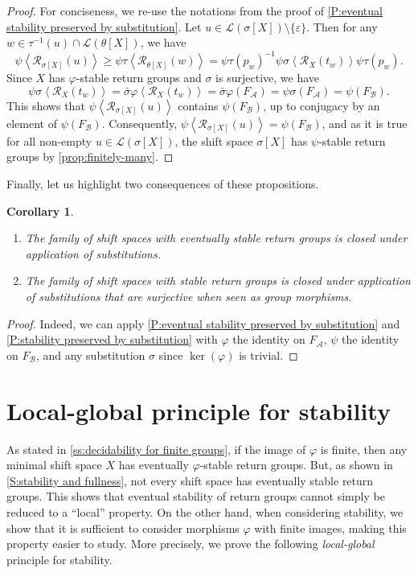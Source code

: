 \documentclass{amsart}
\newcommand*{\ret}{\mathcal{R}}
\newcommand*{\lang}{\mathcal{L}}
\newcommand*{\cA}{\mathcal{A}}
\newcommand*{\cB}{\mathcal{B}}
\newcommand*{\gen}[1]{\left\langle #1\right\rangle}
\theoremstyle{plain}
\newtheorem{corollary}[theorem]{Corollary}
\theoremstyle{definition}
\theoremstyle{remark}
\begin{document}
\begin{proof}
    For conciseness, we re-use the notations from the proof of \cref{P:eventual stability preserved by substitution}.
    Let $u \in \lang(\sigma[X]) \setminus \{\varepsilon\}$. Then for any $w \in \tau^{-1}(u) \cap \lang(\theta[X])$, we have
    \[
        \psi\gen{\ret_{\sigma[X]}(u)} \geq \psi\tau\gen{\ret_{\theta[X]}(w)} = \psi\tau(p_w)^{-1} \psi\sigma\gen{\ret_X(t_w)} \psi\tau(p_w).
    \]
    Since $X$ has $\varphi$-stable return groups and $\sigma$ is surjective, we have
    \[
        \psi\sigma\gen{\ret_X(t_w)} = \bar\sigma\varphi\gen{\ret_X(t_w)} = \bar\sigma\varphi(F_\cA) = \psi\sigma(F_\cA) = \psi(F_\cB).
    \]
    This shows that $\psi\gen{\ret_{\sigma[X]}(u)}$ contains $\psi(F_\cB)$, up to conjugacy by an element of $\psi(F_\cB)$. Consequently, $\psi\gen{\ret_{\sigma[X]}(u)} = \psi(F_\cB)$, and as it is true for all non-empty $u \in \lang(\sigma[X])$, the shift space $\sigma[X]$ has $\psi$-stable return groups by \cref{prop:finitely-many}.
\end{proof}

Finally, let us highlight two consequences of these propositions.

\begin{corollary}\label{c:closed under substitution}\hfill
    \begin{enumerate}
    \item The family of shift spaces with eventually stable return groups is closed under application of substitutions.
    \item The family of shift spaces with stable return groups is closed under application of substitutions that are surjective when seen as group morphisms.
    \end{enumerate}
\end{corollary}
\begin{proof}
    Indeed, we can apply \cref{P:eventual stability preserved by substitution} and \cref{P:stability preserved by substitution} with $\varphi$ the identity on $F_\cA$, $\psi$ the identity on $F_\cB$, and any substitution $\sigma$ since $\ker(\varphi)$ is trivial.
\end{proof}

\section{Local-global principle for stability}\label{S:local-global}

As stated in \cref{ss:decidability for finite groups}, if the image of $\varphi$ is finite, then any minimal shift space $X$ has eventually $\varphi$-stable return groups. But, as shown in \cref{S:stability and fullness}, not every shift space has eventually stable return groups. This shows that eventual stability of return groups cannot simply be reduced to a ``local'' property. On the other hand, when considering stability, we show that it is sufficient to consider morphisms $\varphi$ with finite images, making this property easier to study. More precisely, we prove the following \emph{local-global} principle for stability.
\end{document}
